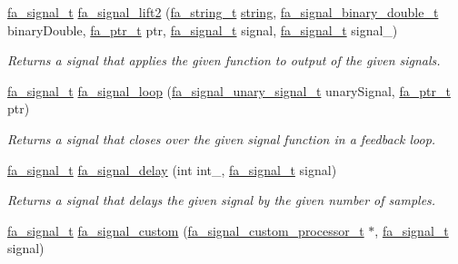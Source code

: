 \begin{DoxyCompactItemize}
\hyperlink{group___fa_signal_gac5c72f160cd6e93a6783551627b166e5}{fa\-\_\-signal\-\_\-t} \hyperlink{group___fa_signal_gaed576fde42afc5f3298a6564c2d2595e}{fa\-\_\-signal\-\_\-lift2} (\hyperlink{group___fa_string_gacada63033b77bc6c39fa632ae199349b}{fa\-\_\-string\-\_\-t} \hyperlink{util_8h_a41106000aac73b61e4fc2ef9dd39a603}{string}, \hyperlink{group___fa_signal_ga7593031729bc7c15d5da9a06ce3eaf4a}{fa\-\_\-signal\-\_\-binary\-\_\-double\-\_\-t} binary\-Double, \hyperlink{group___fa_ga915ddeae99ad7568b273d2b876425197}{fa\-\_\-ptr\-\_\-t} ptr, \hyperlink{group___fa_signal_gac5c72f160cd6e93a6783551627b166e5}{fa\-\_\-signal\-\_\-t} signal, \hyperlink{group___fa_signal_gac5c72f160cd6e93a6783551627b166e5}{fa\-\_\-signal\-\_\-t} signal\-\_\-)
\begin{DoxyCompactList}\small\item\em Returns a signal that applies the given function to output of the given signals. \end{DoxyCompactList}\item 
\hyperlink{group___fa_signal_gac5c72f160cd6e93a6783551627b166e5}{fa\-\_\-signal\-\_\-t} \hyperlink{group___fa_signal_gae940e689d1f147fb76d4272ad3f2a5cc}{fa\-\_\-signal\-\_\-loop} (\hyperlink{group___fa_signal_gaa1f5df5ce102da5b837ccfee4632c7b4}{fa\-\_\-signal\-\_\-unary\-\_\-signal\-\_\-t} unary\-Signal, \hyperlink{group___fa_ga915ddeae99ad7568b273d2b876425197}{fa\-\_\-ptr\-\_\-t} ptr)
\begin{DoxyCompactList}\small\item\em Returns a signal that closes over the given signal function in a feedback loop. \end{DoxyCompactList}\item 
\hyperlink{group___fa_signal_gac5c72f160cd6e93a6783551627b166e5}{fa\-\_\-signal\-\_\-t} \hyperlink{group___fa_signal_ga725db73f7f62b61ed9b34849f2438a07}{fa\-\_\-signal\-\_\-delay} (int int\-\_\-, \hyperlink{group___fa_signal_gac5c72f160cd6e93a6783551627b166e5}{fa\-\_\-signal\-\_\-t} signal)
\begin{DoxyCompactList}\small\item\em Returns a signal that delays the given signal by the given number of samples. \end{DoxyCompactList}\item 
\hyperlink{group___fa_signal_gac5c72f160cd6e93a6783551627b166e5}{fa\-\_\-signal\-\_\-t} \hyperlink{group___fa_signal_gac7b771cb4c1e2e9756b2c63f5d5b6e1b}{fa\-\_\-signal\-\_\-custom} (\hyperlink{structfa__signal__custom__processor__t}{fa\-\_\-signal\-\_\-custom\-\_\-processor\-\_\-t} $\ast$, \hyperlink{group___fa_signal_gac5c72f160cd6e93a6783551627b166e5}{fa\-\_\-signal\-\_\-t} signal)

\end{DoxyCompactItemize}
